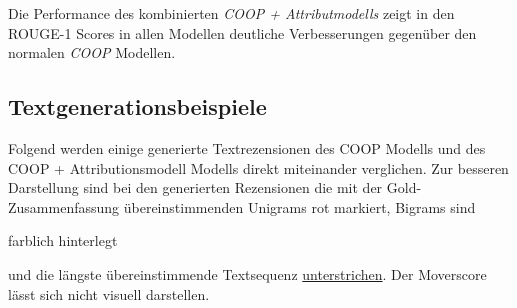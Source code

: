 Die Performance des kombinierten \textit{COOP + Attributmodells} zeigt in den ROUGE-1 Scores in allen Modellen deutliche Verbesserungen gegenüber den normalen \textit{COOP} Modellen.


\subsection{Textgenerationsbeispiele}


\scriptsize
\newlength{\DepthReference}

\newlength{\HeightReference}


\newlength{\Width}%

\newcommand{\ccolorbox}[2][red]%
{%
    \settowidth{\Width}{#2}%
    \setlength{\fboxsep}{1pt}%
    \colorbox{#1}%
    {%
        \raisebox{-\DepthReference}%
        {%
                \parbox[b][\HeightReference+\DepthReference][c]{\Width}{\centering#2}%
        }%
    }%
}



\normalsize


Folgend werden einige generierte Textrezensionen des COOP Modells und des COOP + Attributionsmodell Modells direkt miteinander verglichen.
Zur besseren Darstellung sind bei den generierten Rezensionen die mit der Gold-Zusammenfassung übereinstimmenden Unigrams \textcolor{HighlightColor}{rot} markiert, Bigrams sind \ccolorbox[BackgroundColor]{farblich hinterlegt} und die längste übereinstimmende Textsequenz \underline{unterstrichen}.
Der Moverscore lässt sich nicht visuell darstellen.



\setlength{\fboxsep}{1em}

